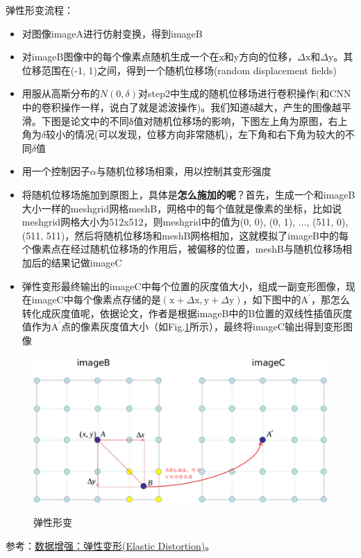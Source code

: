弹性形变流程：
\begin{itemize}
	\item 对图像imageA进行仿射变换，得到imageB
	\item 对imageB图像中的每个像素点随机生成一个在x和y方向的位移，$\Delta \mathrm{x}$和$\Delta \mathrm{y}$。其位移范围在(-1, 1)之间，得到一个随机位移场(random displacement fields)
	\item 用服从高斯分布的$N(0, \delta)$对step2中生成的随机位移场进行卷积操作(和CNN中的卷积操作一样，说白了就是滤波操作)。我们知道δ越大，产生的图像越平滑。下图是论文中的不同δ值对随机位移场的影响，下图左上角为原图，右上角为$\delta$较小的情况(可以发现，位移方向非常随机)，左下角和右下角为较大的不同$\delta$值
	\item 用一个控制因子$\alpha$与随机位移场相乘，用以控制其变形强度
	\item 将随机位移场施加到原图上，具体是\textbf{怎么施加的呢}？首先，生成一个和imageB大小一样的meshgrid网格meshB，网格中的每个值就是像素的坐标，比如说meshgrid网格大小为512x512，则meshgrid中的值为(0, 0), (0, 1), ..., (511, 0), (511, 511)，然后将随机位移场和meshB网格相加，这就模拟了imageB中的每个像素点在经过随机位移场的作用后，被偏移的位置，meshB与随机位移场相加后的结果记做imageC
	\item 弹性变形最终输出的imageC中每个位置的灰度值大小，组成一副变形图像，现在imageC中每个像素点存储的是$(\mathrm{x}+\Delta \mathrm{x}, \mathrm{y}+\Delta \mathrm{y})$，如下图中的$\mathrm{A}^{\prime}$，那怎么转化成灰度值呢，依据论文，作者是根据imageB中的B位置的双线性插值灰度值作为$\mathrm{A}^{\prime}$点的像素灰度值大小（如Fig.\ref{fig:elastic-deform}所示），最终将imageC输出得到变形图像
\end{itemize}
\begin{figure}[h]
	\centering
	\includegraphics[width=.8\textwidth]{pics/elastic_deform.png}
	\label{fig:elastic-deform}
	\caption{弹性形变}
\end{figure}
参考：\href{https://zhuanlan.zhihu.com/p/342274228}{数据增强：弹性变形(Elastic Distortion)}。

